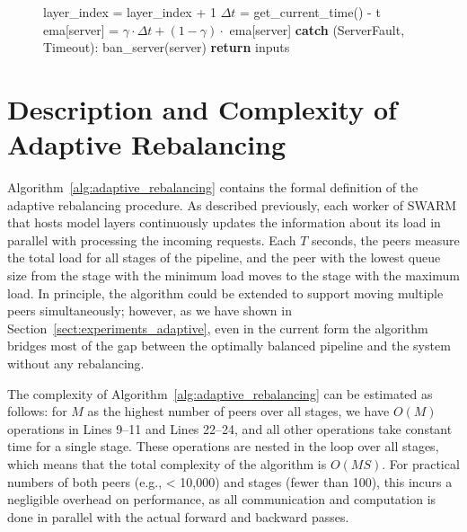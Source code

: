 \begin{figure}[t]
\begin{algorithm}[H]
\begin{algorithmic}[1]
          \STATE \hspace{36px} layer\_index = layer\_index + 1
          \STATE \hspace{36px} $\Delta t$ = get\_current\_time() - t
          \STATE \hspace{36px} ema[server] = $\gamma \cdot \Delta t + (1 - \gamma) \cdot$ ema[server]
          \STATE \hspace{24px} \textbf{catch} (ServerFault, Timeout):
          \STATE \hspace{36px} ban\_server(server)
      \STATE \hspace{12px} \textbf{return} inputs
\end{algorithmic}
\end{algorithm}
\vspace{-25pt}
\end{figure}

\section{Description and Complexity of Adaptive Rebalancing}
\label{appendix:rebalancing_formal}

Algorithm~\ref{alg:adaptive_rebalancing} contains the formal definition of the adaptive rebalancing procedure. As described previously, each worker of SWARM that hosts model layers continuously updates the information about its load in parallel with processing the incoming requests. Each $T$ seconds, the peers measure the total load for all stages of the pipeline, and the peer with the lowest queue size from the stage with the minimum load moves to the stage with the maximum load. In principle, the algorithm could be extended to support moving multiple peers simultaneously; however, as we have shown in Section~\ref{sect:experiments_adaptive}, even in the current form the algorithm bridges most of the gap between the optimally balanced pipeline and the system without any rebalancing.

The complexity of Algorithm~\ref{alg:adaptive_rebalancing} can be estimated as follows: for $M$ as the highest number of peers over all stages, we have $O(M)$ operations in Lines 9--11 and Lines 22--24, and all other operations take constant time for a single stage. These operations are nested in the loop over all stages, which means that the total complexity of the algorithm is $O(MS)$. For practical numbers of both peers (e.g., < 10,000) and stages (fewer than 100), this incurs a negligible overhead on performance, as all communication and computation is done in parallel with the actual forward and backward passes.

